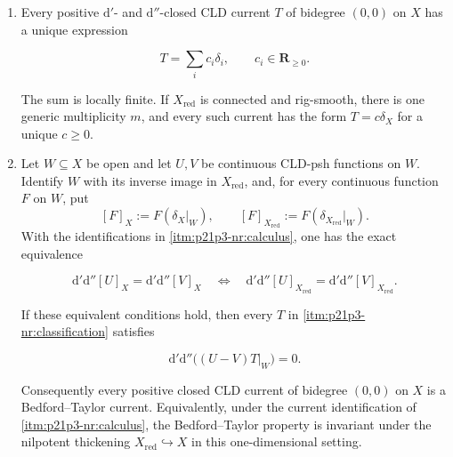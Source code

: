\begin{proposition}
\begin{enumerate}
\begin{equation}
\label{eq:p21p3-nr-fundamental-cycle}
        \delta_X=\sum_i m_i\delta_i,
        \qquad
        \iota_*\delta_{X_{\mathrm{red}}}=\sum_i\delta_i.
\end{equation}

Both sums are locally finite.  In particular,
\(\delta_X=\iota_*\delta_{X_{\mathrm{red}}}\) if and only if \(X\) is
generically reduced along every \(X_i\).

\item\label{itm:p21p3-nr:classification}
Every positive \(\mathrm d'\)- and \(\mathrm d''\)-closed CLD current \(T\)
of bidegree \((0,0)\) on \(X\) has a unique expression

\begin{equation}
\label{eq:p21p3-nr-classification}
                     T=\sum_i c_i\delta_i,
                     \qquad c_i\in\mathbf R_{\geq0}.
\end{equation}

The sum is locally finite.  If \(X_{\mathrm{red}}\) is connected and
rig-smooth, there is one generic multiplicity \(m\), and every such current
has the form \(T=c\delta_X\) for a unique \(c\geq0\).

\item\label{itm:p21p3-nr:bedford-taylor}
Let \(W\subseteq X\) be open and let \(U,V\) be continuous CLD-psh
functions on \(W\).  Identify \(W\) with its inverse image in
\(X_{\mathrm{red}}\), and, for every continuous function \(F\) on \(W\),
put
\[
 [F]_X:=F(\delta_X|_W),\qquad
 [F]_{X_{\mathrm{red}}}:=F(\delta_{X_{\mathrm{red}}}|_W).
\]
With the identifications in \cref{itm:p21p3-nr:calculus}, one has the exact
equivalence

\begin{equation}
\label{eq:p21p3-nr-curvature-equivalence}
 \mathrm d'\mathrm d''[U]_X=\mathrm d'\mathrm d''[V]_X
 \quad\Longleftrightarrow\quad
 \mathrm d'\mathrm d''[U]_{X_{\mathrm{red}}}
   =\mathrm d'\mathrm d''[V]_{X_{\mathrm{red}}}.
\end{equation}

If these equivalent conditions hold, then every \(T\) in
\cref{itm:p21p3-nr:classification} satisfies

\begin{equation}
\label{eq:p21p3-nr-bt-conclusion}
       \mathrm d'\mathrm d''\bigl((U-V)T|_W\bigr)=0.
\end{equation}

Consequently every positive closed CLD current of bidegree \((0,0)\) on
\(X\) is a Bedford--Taylor current.  Equivalently, under the current
identification of \cref{itm:p21p3-nr:calculus}, the Bedford--Taylor
property is invariant under the nilpotent thickening
\(X_{\mathrm{red}}\hookrightarrow X\) in this one-dimensional setting.
\end{enumerate}
\end{proposition}

